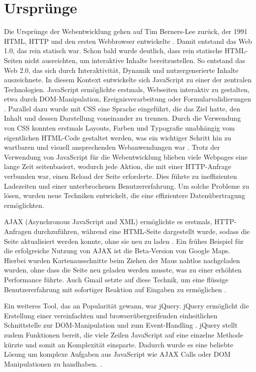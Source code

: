 \documentclass[oneside]{ausarbeitung}
\begin{document}
\section{Ursprünge}
\label{sec:ursprünge}

Die Ursprünge der Webentwicklung gehen auf Tim Berners-Lee zurück, der 1991 HTML, HTTP und den ersten Webbrowser entwickelte \parencite{cern-www}. Damit entstand das Web 1.0, das rein statisch war.
Schon bald wurde deutlich, dass rein statische HTML-Seiten nicht ausreichten, um interaktive Inhalte bereitzustellen. So entstand das Web 2.0, das sich durch Interaktivität, Dynamik und nutzergenerierte Inhalte auszeichnete. In diesem Kontext entwickelte sich JavaScript zu einer der zentralen Technologien. JavaScript ermöglichte erstmals, Webseiten interaktiv zu gestalten, etwa durch DOM-Manipulation, Ereignisverarbeitung oder Formularvalidierungen \parencite{js-history}.
Parallel dazu wurde mit CSS eine Sprache eingeführt, die das Ziel hatte, den Inhalt und dessen Darstellung voneinander zu trennen. Durch die Verwendung von CSS konnten erstmals Layouts, Farben und Typografie unabhängig vom eigentlichen HTML-Code gestaltet werden, was ein wichtiger Schritt hin zu wartbaren und visuell ansprechenden Webanwendungen war \parencite{w3c_css_history}. Trotz der Verwendung von JavaScript für die Webentwicklung blieben viele Webpages eine lange Zeit seitenbasiert, wodurch jede Aktion, die mit einer HTTP-Anfrage verbunden war, einen Reload der Seite erforderte. Dies führte zu ineffizienten Ladezeiten und einer unterbrochenen Benutzererfahrung. Um solche Probleme zu lösen, wurden neue Techniken entwickelt, die eine effizientere Datenübertragung ermöglichten. 

AJAX (Asynchronous JavaScript and XML) ermöglichte es erstmals, HTTP-Anfragen durchzuführen, während eine HTML-Seite dargestellt wurde, sodass die Seite aktualisiert werden konnte, ohne sie neu zu laden \parencite{ajax-msdn}. Ein frühes Beispiel für die erfolgreiche Nutzung von AJAX ist die Beta-Version von Google Maps. Hierbei wurden Kartenausschnitte beim Ziehen der Maus nahtlos nachgeladen wurden, ohne dass die Seite neu geladen werden musste, was zu einer erhöhten Performance führte. Auch Gmail setzte auf diese Technik, um eine flüssige Benutzererfahrung mit sofortiger Reaktion auf Eingaben zu ermöglichen \parencite{paulson2005ajax}.

Ein weiteres Tool, das an Popularität gewann, war jQuery. jQuery ermöglicht die Erstellung einer vereinfachten und browserübergreifenden einheitlichen Schnittstelle zur DOM-Manipulation und zum Event-Handling \parencite{taft2006jquery}. jQuery stellt zudem Funktionen bereit, die viele Zeilen JavaScript auf eine einzelne Methode kürzte und somit an Komplexität einsparte. Dadurch wurde es eine beliebte Lösung um komplexe Aufgaben aus JavaScript wie AJAX Calls oder DOM Manipulationen zu handhaben. \parencite{w3schoolsJquery}.
\end{document}
